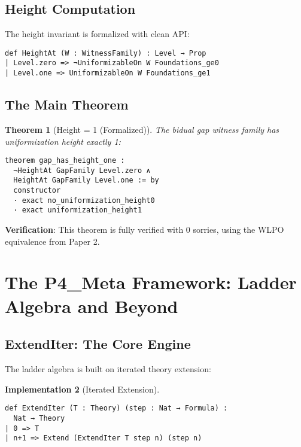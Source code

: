 \documentclass[11pt]{article}
\newtheorem{theorem}{Theorem}[section]
\theoremstyle{definition}
\newtheorem{implementation}[theorem]{Implementation}
\theoremstyle{remark}
\begin{document}
\subsection{Height Computation}

The height invariant is formalized with clean API:

\begin{lstlisting}[language={}]
def HeightAt (W : WitnessFamily) : Level → Prop
| Level.zero => ¬UniformizableOn W Foundations_ge0
| Level.one => UniformizableOn W Foundations_ge1
\end{lstlisting}

\subsection{The Main Theorem}

\begin{theorem}[Height = 1 (Formalized)]
The bidual gap witness family has uniformization height exactly 1:
\begin{lstlisting}[language={}]
theorem gap_has_height_one : 
  ¬HeightAt GapFamily Level.zero ∧ 
  HeightAt GapFamily Level.one := by
  constructor
  · exact no_uniformization_height0
  · exact uniformization_height1
\end{lstlisting}
\end{theorem}

\begin{mdframed}[style=achievement]
\textbf{Verification}: This theorem is fully verified with 0 sorries, using the WLPO equivalence from Paper 2.
\end{mdframed}

\section{The P4\_Meta Framework: Ladder Algebra and Beyond}

\subsection{ExtendIter: The Core Engine}

The ladder algebra is built on iterated theory extension:

\begin{implementation}[Iterated Extension]
\begin{lstlisting}[language={}]
def ExtendIter (T : Theory) (step : Nat → Formula) : 
  Nat → Theory
| 0 => T
| n+1 => Extend (ExtendIter T step n) (step n)
\end{lstlisting}
\end{implementation}
\end{document}
